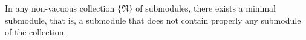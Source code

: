 In any non-vacuous collection $\{\mathfrak{N}\}$ of submodules, there exists a minimal submodule, that is, a submodule that does not contain properly any submodule of the collection.
